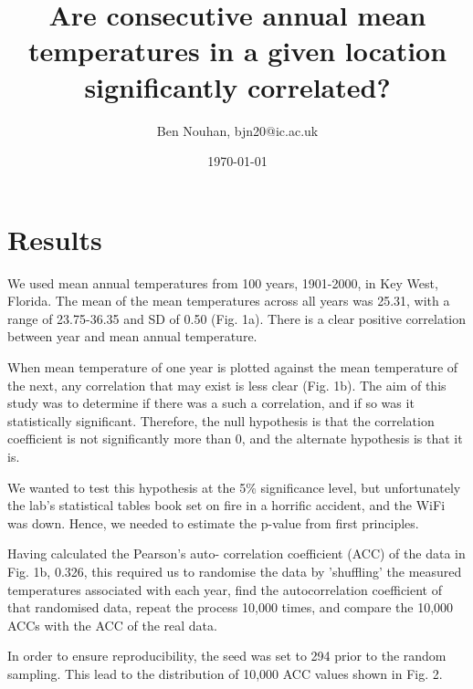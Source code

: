 \documentclass[12pt]{article}
\title{Are consecutive annual mean temperatures in a given location
significantly correlated?}
\author{Ben Nouhan, bjn20@ic.ac.uk}
\date{\today}
\begin{document}
\maketitle

\vspace{2mm} 

\setcounter{section}{3} %
\section{Results}


We used mean annual temperatures from 100 years, 1901-2000, in Key West,
Florida. The mean of the mean temperatures across all years was  25.31, with a
range of 23.75-36.35 and SD of 0.50 (Fig. 1a). There is a clear positive
correlation between year and mean annual temperature.

When mean temperature of one year is plotted against 
the mean temperature of the next, any correlation that may exist is less clear 
(Fig. 1b). The aim of this study was to determine if there was a such a
correlation, and if so was it statistically significant. Therefore, the null 
hypothesis is that the correlation coefficient is not significantly more than 0, 
and the alternate hypothesis is that it is.

We wanted to test this hypothesis at the 5\%
significance level, but unfortunately the lab's statistical tables book set on 
fire in a horrific accident, and the WiFi was down. Hence, we needed to estimate 
the p-value from first principles.

Having calculated the Pearson's auto-
correlation coefficient (ACC) of the data in Fig. 1b, 0.326, this required us to 
randomise the data by 'shuffling' the measured temperatures associated with each 
year, find the autocorrelation coefficient of that randomised data, repeat the 
process 10,000 times, and compare the 10,000 ACCs with the ACC of the real data. 

In order to ensure reproducibility, the seed was set to 294 prior to the 
random sampling. This lead to the distribution of 10,000 ACC values shown in 
Fig. 2.
\end{document}

